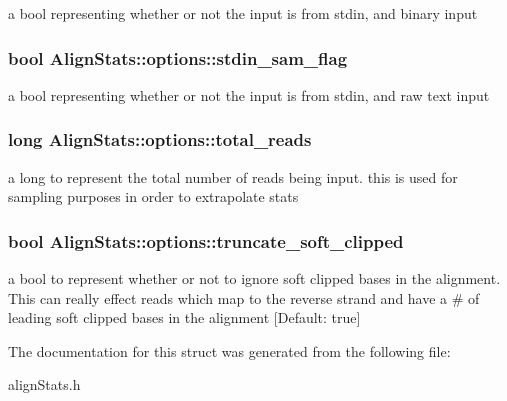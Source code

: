 \label{struct_align_stats_1_1options_a134d6b9c72e42947b581cc9d88c7f219}
a bool representing whether or not the input is from stdin, and binary input \hypertarget{struct_align_stats_1_1options_ac71f2469bdd8a1303cb7fbc21bf6d61a}{
\subsubsection[{stdin\_\-sam\_\-flag}]{\setlength{\rightskip}{0pt plus 5cm}bool {\bf AlignStats::options::stdin\_\-sam\_\-flag}}}
\label{struct_align_stats_1_1options_ac71f2469bdd8a1303cb7fbc21bf6d61a}
a bool representing whether or not the input is from stdin, and raw text input \hypertarget{struct_align_stats_1_1options_a13b8f29a0ad066ba915ee118c21c9b8d}{
\subsubsection[{total\_\-reads}]{\setlength{\rightskip}{0pt plus 5cm}long {\bf AlignStats::options::total\_\-reads}}}
\label{struct_align_stats_1_1options_a13b8f29a0ad066ba915ee118c21c9b8d}
a long to represent the total number of reads being input. this is used for sampling purposes in order to extrapolate stats \hypertarget{struct_align_stats_1_1options_a1df99156054317dbb94f18912ee045b7}{
\subsubsection[{truncate\_\-soft\_\-clipped}]{\setlength{\rightskip}{0pt plus 5cm}bool {\bf AlignStats::options::truncate\_\-soft\_\-clipped}}}
\label{struct_align_stats_1_1options_a1df99156054317dbb94f18912ee045b7}
a bool to represent whether or not to ignore soft clipped bases in the alignment. This can really effect reads which map to the reverse strand and have a \# of leading soft clipped bases in the alignment \mbox{[}Default: true\mbox{]} 

The documentation for this struct was generated from the following file:\begin{DoxyCompactItemize}
\item 
alignStats.h\end{DoxyCompactItemize}
